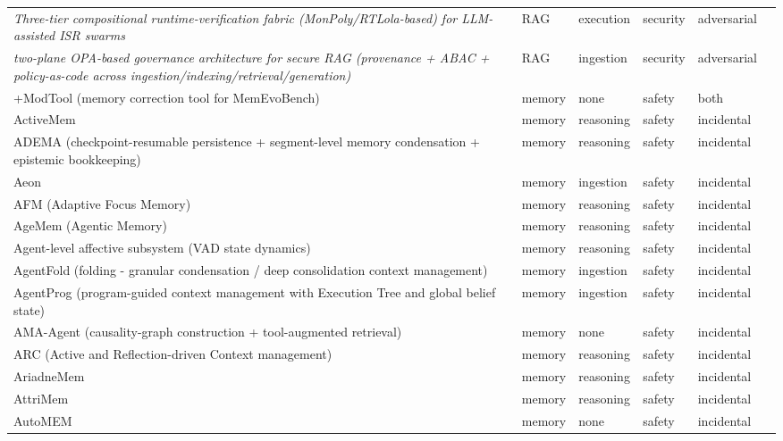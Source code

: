 \begin{longtable}{@{}>{\raggedright\arraybackslash}p{}lllll@{}}
\emph{Three-tier compositional runtime-verification fabric (MonPoly/RTLola-based) for LLM-assisted ISR swarms} & RAG & execution & security & adversarial & \cite{kekatos-2026-missionlevel} \\
\emph{two-plane OPA-based governance architecture for secure RAG (provenance + ABAC + policy-as-code across ingestion/indexing/retrieval/generation)} & RAG & ingestion & security & adversarial & \cite{boggarapu-2026-secure} \\
+ModTool (memory correction tool for MemEvoBench) & memory & none & safety & both & \cite{xie-2026-memevobench} \\
ActiveMem & memory & reasoning & safety & incidental & \cite{jiang-2026-activemem} \\
ADEMA (checkpoint-resumable persistence + segment-level memory condensation + epistemic bookkeeping) & memory & reasoning & safety & incidental & \cite{zhou-2026-adema} \\
Aeon & memory & ingestion & safety & incidental & \cite{arslan-2026-aeon} \\
AFM (Adaptive Focus Memory) & memory & reasoning & safety & incidental & \cite{cruz-2025-adaptive} \\
AgeMem (Agentic Memory) & memory & reasoning & safety & incidental & \cite{yu-2026-agentic} \\
Agent-level affective subsystem (VAD state dynamics) & memory & reasoning & safety & incidental & \cite{subaharan-2026-controlling} \\
AgentFold (folding - granular condensation / deep consolidation context management) & memory & ingestion & safety & incidental & \cite{ye-2025-agentfold} \\
AgentProg (program-guided context management with Execution Tree and global belief state) & memory & ingestion & safety & incidental & \cite{tian-2025-agentprog} \\
AMA-Agent (causality-graph construction + tool-augmented retrieval) & memory & none & safety & incidental & \cite{zhao-2026-amabench} \\
ARC (Active and Reflection-driven Context management) & memory & reasoning & safety & incidental & \cite{yao-2026-arc} \\
AriadneMem & memory & reasoning & safety & incidental & \cite{zhu-2026-ariadnemem} \\
AttriMem & memory & reasoning & safety & incidental & \cite{li-2026-attrimem} \\
AutoMEM & memory & none & safety & incidental & \cite{chen-2026-exploring} \\

\end{longtable}
